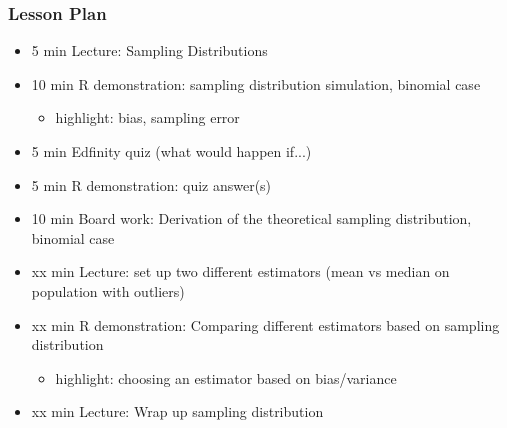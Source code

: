 

\begin{frame}
\frametitle{Lesson Plan}
\begin{itemize}
    \item 5 min Lecture: Sampling Distributions
    \item 10 min R demonstration: sampling distribution simulation, binomial case
    \begin{itemize}
        \item  highlight: bias, sampling error
    \end{itemize}
    \item 5 min Edfinity quiz (what would happen if...)
    \item 5 min R demonstration: quiz answer(s)
    \item 10 min Board work: Derivation of the theoretical sampling distribution, binomial case
    \item xx min Lecture: set up two different estimators (mean vs median on population with outliers) 
    \item xx min R demonstration: Comparing different estimators based on sampling distribution 
    \begin{itemize}
        \item  highlight: choosing an estimator based on bias/variance
    \end{itemize}
    \item xx min Lecture: Wrap up sampling distribution
\end{itemize}
\end{frame}


